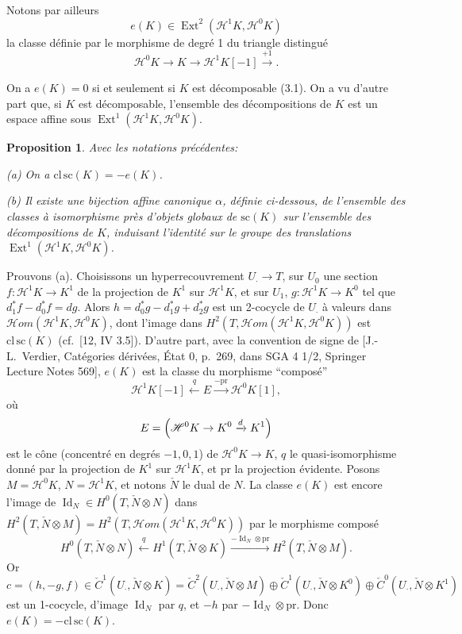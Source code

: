 \documentclass[12pt,a4paper]{article}
\theoremstyle{plain}
\newtheorem{proposition}[theorem]{Proposition}
\theoremstyle{definition}
\theoremstyle{remark}
\DeclareMathOperator{\Ext}{Ext}
\DeclareMathOperator{\Id}{Id}
\begin{document}
Notons par ailleurs
\[
e(K) \in \Ext^2(\mathscr{H}^1 K, \mathscr{H}^0 K)
\]
la classe d\'efinie par le morphisme de degr\'e 1 du triangle distingu\'e
\[
\mathscr{H}^0 K \to K \to \mathscr{H}^1 K[-1] \xrightarrow{+1}.
\]

On a $e(K) = 0$ si et seulement si $K$ est d\'ecomposable (3.1). On a vu d'autre part que, si $K$ est d\'ecomposable, l'ensemble des d\'ecompositions de $K$ est un espace affine sous $\Ext^1(\mathscr{H}^1 K, \mathscr{H}^0 K)$.

\begin{proposition}\label{prop:3.3}
Avec les notations pr\'ec\'edentes:

\textup{(a)} On a $\mathrm{cl}\,\mathrm{sc}(K) = -e(K)$.

\textup{(b)} Il existe une bijection affine canonique $\alpha$, d\'efinie ci-dessous, de l'ensemble des classes \`a isomorphisme pr\`es d'objets globaux de $\mathrm{sc}(K)$ sur l'ensemble des d\'ecompositions de $K$, induisant l'identit\'e sur le groupe des translations $\Ext^1(\mathscr{H}^1 K, \mathscr{H}^0 K)$.
\end{proposition}

Prouvons (a). Choisissons un hyperrecouvrement $U_\cdot \to T$, sur $U_0$ une section $f: \mathscr{H}^1 K \to K^1$ de la projection de $K^1$ sur $\mathscr{H}^1 K$, et sur $U_1$, $g: \mathscr{H}^1 K \to K^0$ tel que $d_1^* f - d_0^* f = dg$. Alors $h = d_0^* g - d_1^* g + d_2^* g$ est un 2-cocycle de $U_\cdot$ \`a valeurs dans $\mathscr{H}om(\mathscr{H}^1 K, \mathscr{H}^0 K)$, dont l'image dans $H^2(T, \mathscr{H}om(\mathscr{H}^1 K, \mathscr{H}^0 K))$ est $\mathrm{cl}\, \mathrm{sc}(K)$ (cf.~[12, IV 3.5]). D'autre part, avec la convention de signe de [J.-L.~Verdier, Cat\'egories d\'eriv\'ees, \'Etat 0, p.~269, dans SGA 4 1/2, Springer Lecture Notes 569], $e(K)$ est la classe du morphisme ``compos\'e''
\[
\mathscr{H}^1 K[-1] \xleftarrow{q} E \xrightarrow{-\mathrm{pr}} \mathscr{H}^0 K[1],
\]
o\`u
\[
E = \Bigl( \mathscr{H}^0 K \to K^0 \xrightarrow{d} K^1 \Bigr)
\]
est le c\^one (concentr\'e en degr\'es $-1, 0, 1$) de $\mathscr{H}^0 K \to K$, $q$ le quasi-isomorphisme donn\'e par la projection de $K^1$ sur $\mathscr{H}^1 K$, et $\mathrm{pr}$ la projection \'evidente. Posons $M = \mathscr{H}^0 K$, $N = \mathscr{H}^1 K$, et notons $\check{N}$ le dual de $N$. La classe $e(K)$ est encore l'image de $\Id_N \in H^0(T, \check{N} \otimes N)$ dans $H^2(T, \check{N} \otimes M) = H^2(T, \mathscr{H}om(\mathscr{H}^1 K, \mathscr{H}^0 K))$ par le morphisme compos\'e
\[
H^0(T, \check{N} \otimes N) \xleftarrow{q} H^1(T, \check{N} \otimes K) \xrightarrow{-\Id_N \otimes \mathrm{pr}} H^2(T, \check{N} \otimes M).
\]
Or
\[
c = (h, -g, f) \in \check{C}^1(U_\cdot, \check{N} \otimes K) = \check{C}^2(U_\cdot, \check{N} \otimes M) \oplus \check{C}^1(U_\cdot, \check{N} \otimes K^0) \oplus \check{C}^0(U_\cdot, \check{N} \otimes K^1)
\]
est un 1-cocycle, d'image $\Id_N$ par $q$, et $-h$ par $-\Id_N \otimes \mathrm{pr}$. Donc $e(K) = -\mathrm{cl}\, \mathrm{sc}(K)$.
\end{document}
